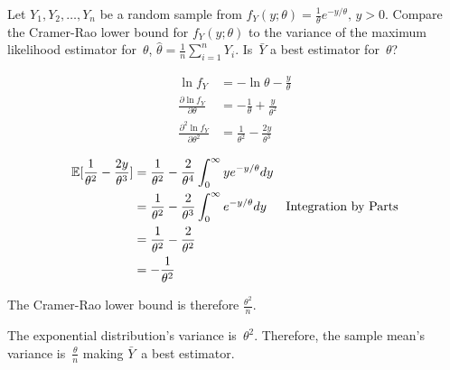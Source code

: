 \begin{problem}
   Let ${Y_1,Y_2,\ldots,Y_n}$ be a random sample from ${f_{Y}(y;\theta) = \frac{1}{\theta} e^{-y/\theta}\text{, } y > 0}$.  Compare the Cramer-Rao lower bound for ${f_{Y}(y;\theta)}$ to the variance of the maximum likelihood estimator for~$\theta$, ${\hat{\theta} = \frac{1}{n}\sum_{i=1}^{n}Y_i}$. Is~$\bar{Y}$ a best estimator for~$\theta$?
\end{problem}

\begin{align}
  \ln f_Y &= -\ln\theta - \frac{y}{\theta} \\
  \frac{\partial \ln f_Y}{\partial \theta} &= -\frac{1}{\theta} + \frac{y}{\theta^2} \\
  \frac{\partial^{2} \ln f_Y}{\partial \theta^{2}} &= \frac{1}{\theta^2} - \frac{2y}{\theta^3}
\end{align}

\begin{align}
  \mathbb{E}\lbrack\frac{1}{\theta^2} - \frac{2y}{\theta^3}\rbrack &= \frac{1}{\theta^2} - \frac{2}{\theta^4} \int_{0}^{\infty} ye^{-y/\theta} dy \\
                                                    &= \frac{1}{\theta^2} - \frac{2}{\theta^3} \int_{0}^{\infty} e^{-y/\theta} dy  & \text{Integration by Parts} \\
                                                    &= \frac{1}{\theta^2} - \frac{2}{\theta^2} \\
                                                    &= - \frac{1}{\theta^2}
\end{align}

The Cramer-Rao lower bound is therefore ${\boxed{\frac{\theta^2}{n}}}$.

The exponential distribution's variance is~$\theta^2$.  Therefore, the sample mean's variance is~$\frac{\theta}{n}$ making $\bar{Y}$~a best estimator.

